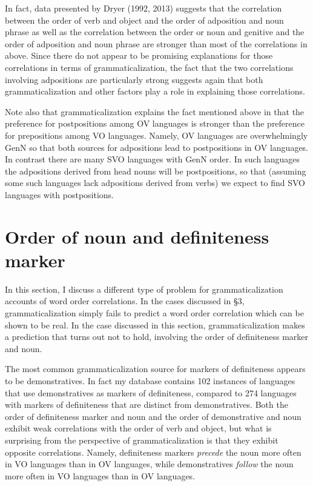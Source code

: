\documentclass[output=paper]{langsci/langscibook}
\begin{document}
In fact, data presented by Dryer (1992, 2013) suggests that the correlation between the order of verb and object and the order of adposition and noun phrase as well as the correlation between the order or noun and genitive and the order of adposition and noun phrase are stronger than most of the correlations in  above. Since there do not appear to be promising explanations for those correlations in terms of grammaticalization, the fact that the two correlations involving adpositions are particularly strong suggests again that both grammaticalization and other factors play a role in explaining those correlations.

Note also that grammaticalization explains the fact mentioned above in  that the preference for postpositions among OV languages is stronger than the preference for prepositions among VO languages. Namely, OV languages are overwhelmingly GenN so that both sources for adpositions lead to postpositions in OV languages. In contrast there are many SVO languages with GenN order. In such languages the adpositions derived from head nouns will be postpositions, so that (assuming some such languages lack adpositions derived from verbs) we expect to find SVO languages with postpositions.

\section{Order of noun and definiteness marker}

In this section, I discuss a different type of problem for grammaticalization accounts of word order correlations. In the cases discussed in §3, grammaticalization simply fails to predict a word order correlation which can be shown to be real. In the case discussed in this section, grammaticalization makes a prediction that turns out not to hold, involving the order of definiteness marker and noun.

The most common grammaticalization source for markers of definiteness appears to be demonstratives. In fact my database contains 102 instances of languages that use demonstratives as markers of definiteness, compared to 274 languages with markers of definiteness that are distinct from demonstratives. Both the order of definiteness marker and noun and the order of demonstrative and noun exhibit weak correlations with the order of verb and object, but what is surprising from the perspective of grammaticalization is that they exhibit opposite correlations. Namely, definiteness markers \textit{precede} the noun more often in VO languages than in OV languages, while demonstratives \textit{follow} the noun more often in VO languages than in OV languages.
\end{document}
